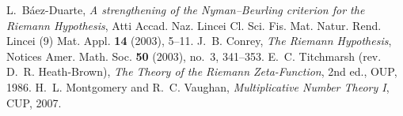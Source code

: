 \documentclass[11pt]{article}
\theoremstyle{remark}
\begin{document}
\begin{thebibliography}{9}
L.~B\'aez-Duarte,
\emph{A strengthening of the Nyman--Beurling criterion for the Riemann Hypothesis},
Atti Accad. Naz. Lincei Cl. Sci. Fis. Mat. Natur. Rend. Lincei (9) Mat. Appl. \textbf{14} (2003), 5--11.
J.~B. Conrey,
\emph{The Riemann Hypothesis},
Notices Amer. Math. Soc. \textbf{50} (2003), no.~3, 341--353.
E.~C. Titchmarsh (rev. D.~R. Heath-Brown),
\emph{The Theory of the Riemann Zeta-Function}, 2nd ed., OUP, 1986.
H.~L. Montgomery and R.~C. Vaughan,
\emph{Multiplicative Number Theory I}, CUP, 2007.
\end{thebibliography}
\end{document}
